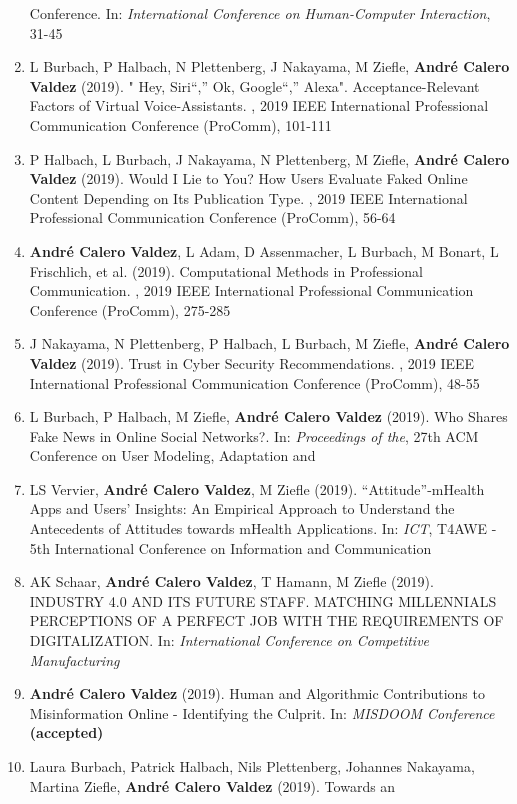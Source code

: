 \documentclass[11pt,a4paper,sans]{moderncv}
\begin{document}
\begin{enumerate}
  Conference. In: \emph{International Conference on Human-Computer
  Interaction}, 31-45
\item
  L Burbach, P Halbach, N Plettenberg, J Nakayama, M Ziefle,
  \textbf{André Calero Valdez} (2019). " Hey, Siri``,'' Ok, Google``,''
  Alexa". Acceptance-Relevant Factors of Virtual Voice-Assistants. ,
  2019 IEEE International Professional Communication Conference
  (ProComm), 101-111
\item
  P Halbach, L Burbach, J Nakayama, N Plettenberg, M Ziefle,
  \textbf{André Calero Valdez} (2019). Would I Lie to You? How Users
  Evaluate Faked Online Content Depending on Its Publication Type. ,
  2019 IEEE International Professional Communication Conference
  (ProComm), 56-64
\item
  \textbf{André Calero Valdez}, L Adam, D Assenmacher, L Burbach, M
  Bonart, L Frischlich, et al. (2019). Computational Methods in
  Professional Communication. , 2019 IEEE International Professional
  Communication Conference (ProComm), 275-285
\item
  J Nakayama, N Plettenberg, P Halbach, L Burbach, M Ziefle,
  \textbf{André Calero Valdez} (2019). Trust in Cyber Security
  Recommendations. , 2019 IEEE International Professional Communication
  Conference (ProComm), 48-55
\item
  L Burbach, P Halbach, M Ziefle, \textbf{André Calero Valdez} (2019).
  Who Shares Fake News in Online Social Networks?. In: \emph{Proceedings
  of the}, 27th ACM Conference on User Modeling, Adaptation and~
\item
  LS Vervier, \textbf{André Calero Valdez}, M Ziefle (2019).
  ``Attitude''-mHealth Apps and Users' Insights: An Empirical Approach
  to Understand the Antecedents of Attitudes towards mHealth
  Applications. In: \emph{ICT}, T4AWE - 5th International Conference on
  Information and Communication~
\item
  AK Schaar, \textbf{André Calero Valdez}, T Hamann, M Ziefle (2019).
  INDUSTRY 4.0 AND ITS FUTURE STAFF. MATCHING MILLENNIALS PERCEPTIONS OF
  A PERFECT JOB WITH THE REQUIREMENTS OF DIGITALIZATION. In:
  \emph{International Conference on Competitive Manufacturing}
\item
  \textbf{André Calero Valdez} (2019). Human and Algorithmic
  Contributions to Misinformation Online - Identifying the Culprit. In:
  \emph{MISDOOM Conference} \textbf{(accepted)}
\item
  Laura Burbach, Patrick Halbach, Nils Plettenberg, Johannes Nakayama,
  Martina Ziefle, \textbf{André Calero Valdez} (2019). Towards an

\end{enumerate}
\end{document}
